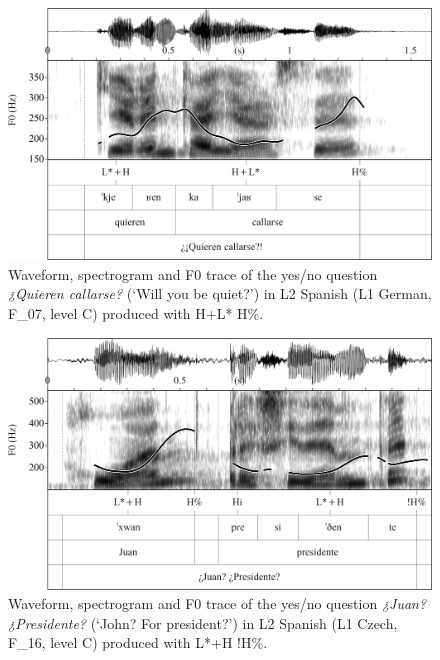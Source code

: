 \begin{figure}


\includegraphics[width=\textwidth]{figures/Figure_4.80.png}



\caption{Waveform, spectrogram and F0 trace of the yes/no question \textit{¿Quieren callarse?} (‘Will you be quiet?’) in L2 Spanish (L1 German, F\_07, level C) produced with H+L* H\%.}
\label{fig:4.80}
\end{figure}

\begin{figure}


\includegraphics[width=\textwidth]{figures/Figure_4.81.png}



\caption{Waveform, spectrogram and F0 trace of the yes/no question \textit{¿Juan? ¿Presidente?} (‘John? For president?’) in L2 Spanish (L1 Czech, \mbox{F\_16}, level C) produced with L*+H !H\%.}
\label{fig:4.81}
\end{figure}

